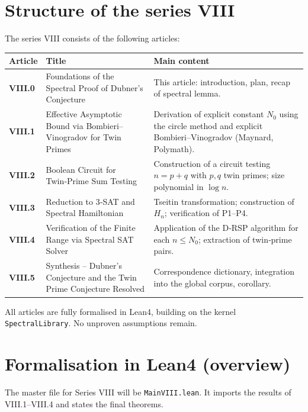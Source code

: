 \documentclass[11pt,a4paper]{article}
\begin{document}
\section{Structure of the series VIII}

The series VIII consists of the following articles:

\begin{center}
\small
\begin{tabular}{@{}>{\bfseries}l>{\raggedright\arraybackslash}p{4.5cm}>{\raggedright\arraybackslash}p{6cm}@{}}
\toprule
\textbf{Article} & \textbf{Title} & \textbf{Main content} \\
\midrule
VIII.0 & Foundations of the Spectral Proof of Dubner's Conjecture & This article: introduction, plan, recap of spectral lemma. \\
VIII.1 & Effective Asymptotic Bound via Bombieri–Vinogradov for Twin Primes & Derivation of explicit constant \(N_0\) using the circle method and explicit Bombieri–Vinogradov (Maynard, Polymath). \\
VIII.2 & Boolean Circuit for Twin‑Prime Sum Testing & Construction of a circuit testing \(n = p+q\) with \(p,q\) twin primes; size polynomial in \(\log n\). \\
VIII.3 & Reduction to 3‑SAT and Spectral Hamiltonian & Tseitin transformation; construction of \(H_n\); verification of P1–P4. \\
VIII.4 & Verification of the Finite Range via Spectral SAT Solver & Application of the D‑RSP algorithm for each \(n \le N_0\); extraction of twin‑prime pairs. \\
VIII.5 & Synthesis – Dubner's Conjecture and the Twin Prime Conjecture Resolved & Correspondence dictionary, integration into the global corpus, corollary. \\
\bottomrule
\end{tabular}
\normalsize
\end{center}

All articles are fully formalised in Lean4, building on the kernel \texttt{SpectralLibrary}. No unproven assumptions remain.

\section{Formalisation in Lean4 (overview)}

The master file for Series VIII will be \texttt{MainVIII.lean}. It imports the results of VIII.1–VIII.4 and states the final theorems.
\end{document}
